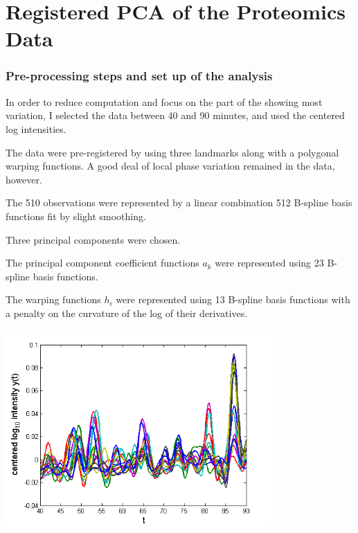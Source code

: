 \documentclass[11pt]{beamer}
\begin{document}

\section{Registered PCA of the Proteomics Data}



\begin{frame}

\frametitle{Pre-processing steps and set up of the analysis}

\bi
  \item In order to reduce computation and focus on the part of the showing most variation, I selected the data between 40 and 90 minutes, and used the centered log intensities.
  \item The data were pre-registered by using three landmarks along with a polygonal warping functions.  A good deal of local phase variation remained in the data, however.
  \item The 510 observations were represented by a linear combination 512 B-spline basis functions fit by slight smoothing.
  \item Three principal components were chosen.
  \item The principal component coefficient functions $a_k$ were represented using 23 B-spline basis functions.
  \item The warping functions $h_i$ were represented using 13 B-spline basis functions with a penalty on the curvature of the log of their derivatives.
\ei

\end{frame}


\begin{frame}

\begin{center}
\includegraphics[width=4in]{figs/SelTIC_Ctr.png}
\end{center}

\end{frame}
\end{document}
